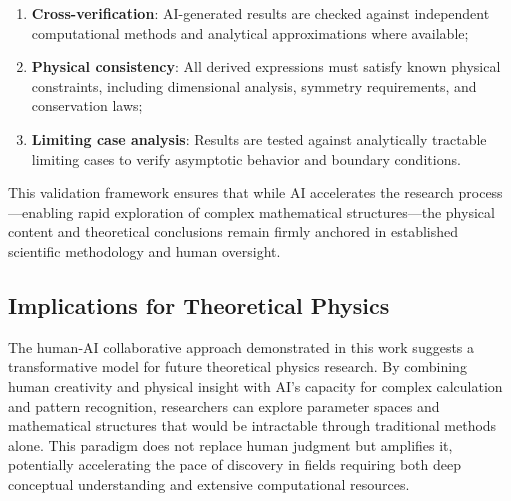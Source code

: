 \begin{enumerate}
    \item \textbf{Cross-verification}: AI-generated results are checked 
          against independent computational methods and analytical 
          approximations where available;
    
    \item \textbf{Physical consistency}: All derived expressions must 
          satisfy known physical constraints, including dimensional 
          analysis, symmetry requirements, and conservation laws;
    
    \item \textbf{Limiting case analysis}: Results are tested against 
          analytically tractable limiting cases to verify asymptotic 
          behavior and boundary conditions.
\end{enumerate}

This validation framework ensures that while AI accelerates the research 
process—enabling rapid exploration of complex mathematical structures—the 
physical content and theoretical conclusions remain firmly anchored in 
established scientific methodology and human oversight.

\subsection{Implications for Theoretical Physics}

The human-AI collaborative approach demonstrated in this work suggests 
a transformative model for future theoretical physics research. By 
combining human creativity and physical insight with AI's capacity for 
complex calculation and pattern recognition, researchers can explore 
parameter spaces and mathematical structures that would be intractable 
through traditional methods alone. This paradigm does not replace human 
judgment but amplifies it, potentially accelerating the pace of discovery 
in fields requiring both deep conceptual understanding and extensive 
computational resources.
